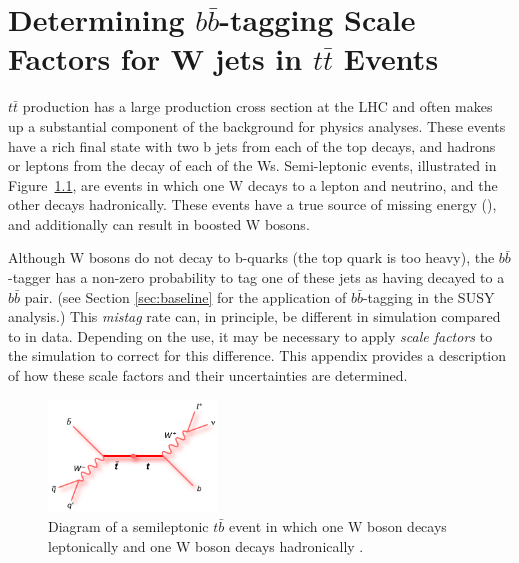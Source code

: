 \chapter{Determining $b\bar{b}$-tagging Scale Factors for W jets in $t\bar{t}$ Events}
\label{chap:bbsf}

$t\bar{t}$ production has a large production cross section at the LHC and often makes up a substantial component of the background for physics analyses. These events have a rich final state with two b jets from each of the top decays, and hadrons or leptons from the decay of each of the Ws. Semi-leptonic events, illustrated in Figure~\ref{fig:ttbar}, are events in which one W decays to a lepton and neutrino, and the other decays hadronically. These events have a true source of missing energy (\ptmiss), and additionally can result in boosted W bosons.

Although W bosons do not decay to b-quarks (the top quark is too heavy), the $b\bar{b}$-tagger has a non-zero probability to tag one of these jets as having decayed to a $b\bar{b}$ pair. (see Section \ref{sec:baseline} for the application of $b\bar{b}$-tagging in the SUSY analysis.) This \textit{mistag} rate can, in principle, be different in simulation compared to in data. Depending on the use, it may be necessary to apply \textit{scale factors} to the simulation to correct for this difference. This appendix provides a description of how these scale factors and their uncertainties are determined.

\begin{figure}[hbp!]
\centering
\includegraphics[width=0.4\textwidth]{figs/feynman_ttbar_ljets_beamline.png}
\caption[Diagram of a semileptonic $t\bar{b}$ event in which one W boson decays leptonically and one W boson decays hadronically.]{Diagram of a semileptonic $t\bar{b}$ event in which one W boson decays leptonically and one W boson decays hadronically \cite{ttbar}.}
\label{fig:ttbar}
\end{figure}

